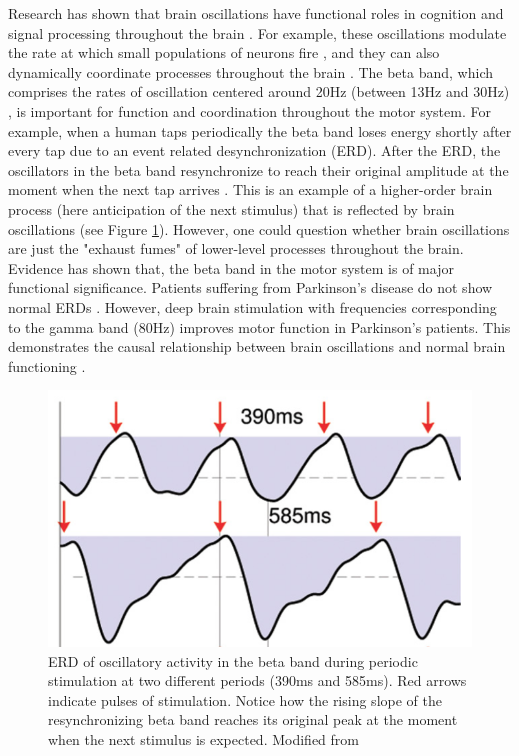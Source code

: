 \documentclass{article}
\begin{document}
Research has shown that brain oscillations have functional roles in cognition and signal processing throughout the brain \cite{sejnowski2006network}. For example, these oscillations modulate the rate at which small populations of neurons fire \cite{engel2001dynamic}, and they can also dynamically coordinate processes throughout the brain \cite{varela2001brainweb} \cite{engel2010beta}. The beta band, which comprises the rates of oscillation centered around 20Hz (between 13Hz and 30Hz) \cite{engel2010beta}, is important for function and coordination throughout the motor system. For example, when a human taps periodically the beta band loses energy shortly after every tap due to an event related desynchronization (ERD). After the ERD, the oscillators in the beta band resynchronize to reach their original amplitude at the moment when the next tap arrives \cite{fujioka2012internalized}. This is an example of a higher-order brain process (here anticipation of the next stimulus) that is reflected by brain oscillations (see Figure \ref{fig:ERD}). However, one could question whether brain oscillations are just the "exhaust fumes" of lower-level processes throughout the brain. Evidence has shown that, the beta band in the motor system is of major functional significance. Patients suffering from Parkinson's disease do not show normal ERDs \cite{magnani1998event}. However, deep brain stimulation with frequencies corresponding to the gamma band (80Hz) improves motor function in Parkinson's patients. This demonstrates the causal relationship between brain oscillations and normal brain functioning \cite{swann2011deep}.

\begin{figure}
  \centering
  \includegraphics[scale=0.75]{betaERD.png}
  \caption{ERD of oscillatory activity in the beta band during periodic  stimulation at two different periods (390ms and 585ms). Red arrows indicate pulses of stimulation. Notice how the rising slope of the resynchronizing beta band reaches its original peak at the moment when the next stimulus is expected. Modified from \cite{fujioka2012internalized}}
  \label{fig:ERD}
\end{figure}
\end{document}

